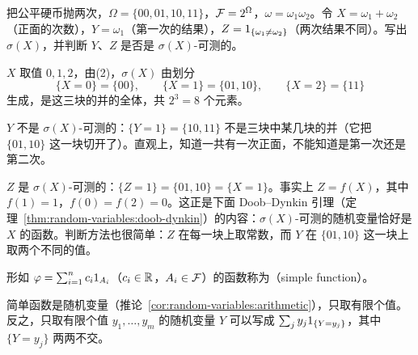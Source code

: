 \begin{workedexample}\label{we:random-variables:sigma-sum}
把公平硬币抛两次，$\Omega=\{00,01,10,11\}$，$\mathcal{F}=2^\Omega$，$\omega=\omega_1\omega_2$。令 $X=\omega_1+\omega_2$（正面的次数），$Y=\omega_1$（第一次的结果），$Z=1_{\{\omega_1\neq\omega_2\}}$（两次结果不同）。写出 $\sigma(X)$，并判断 $Y$、$Z$ 是否是 $\sigma(X)$-可测的。
\end{workedexample}
\begin{solution}
$X$ 取值 $0,1,2$，由(2)，$\sigma(X)$ 由划分
\[
\{X=0\}=\{00\},\qquad\{X=1\}=\{01,10\},\qquad\{X=2\}=\{11\}
\]
生成，是这三块的并的全体，共 $2^3=8$ 个元素。

$Y$ 不是 $\sigma(X)$-可测的：$\{Y=1\}=\{10,11\}$ 不是三块中某几块的并（它把 $\{01,10\}$ 这一块切开了）。直观上，知道一共有一次正面，不能知道是第一次还是第二次。

$Z$ 是 $\sigma(X)$-可测的：$\{Z=1\}=\{01,10\}=\{X=1\}$。事实上 $Z=f(X)$，其中 $f(1)=1$，$f(0)=f(2)=0$。这正是下面 Doob--Dynkin 引理（定理~\ref{thm:random-variables:doob-dynkin}）的内容：$\sigma(X)$-可测的随机变量恰好是 $X$ 的函数。判断方法也很简单：$Z$ 在每一块上取常数，而 $Y$ 在 $\{01,10\}$ 这一块上取两个不同的值。
\end{solution}


\begin{definition}[简单函数]\label{def:random-variables:simple}
形如 $\varphi=\sum_{i=1}^nc_i1_{A_i}$（$c_i\in\mathbb{R}$，$A_i\in\mathcal{F}$）的函数称为（simple function）。
\end{definition}

简单函数是随机变量（推论~\ref{cor:random-variables:arithmetic}），只取有限个值。反之，只取有限个值 $y_1,\dots,y_m$ 的随机变量 $Y$ 可以写成 $\sum_jy_j1_{\{Y=y_j\}}$，其中 $\{Y=y_j\}$ 两两不交。

